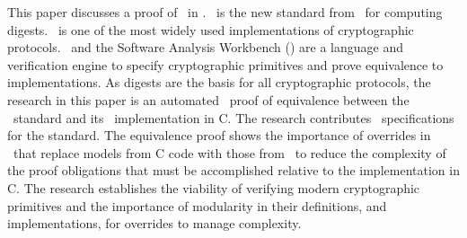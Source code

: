 This paper discusses a proof of \shaThree\ in \openssl.
\shaThree\ is the new standard from \nist\ for computing digests. 
\openssl\ is one of the most widely used implementations of cryptographic protocols.
\cryptol\ and the Software Analysis Workbench (\saw) are a language and verification engine to specify cryptographic primitives and prove equivalence to implementations.
As digests are the basis for all cryptographic protocols, the research in this paper is an automated \saw\ proof of equivalence between the \shaThree\ standard and its \openssl\ implementation in C.
The research contributes \cryptol\ specifications for the standard.
The equivalence proof shows the importance of overrides in \saw\ that replace models from C code with those from \cryptol\ to reduce the complexity of the proof obligations that must be accomplished relative to the implementation in C.
The research establishes the viability of verifying modern cryptographic primitives and the importance of modularity in their definitions, and implementations, for overrides to manage complexity.

